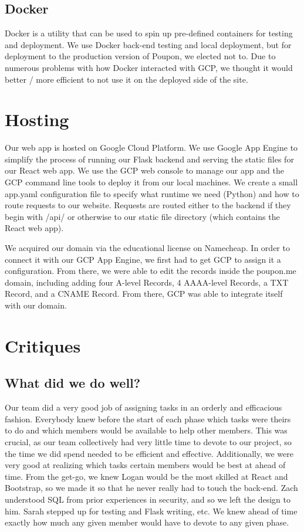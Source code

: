 \documentclass{scrartcl}
\begin{document}
    \subsection{Docker}\label{subsec:docker}
    Docker is a utility that can be used to spin up pre-defined containers for testing and deployment.
    We use Docker back-end testing and local deployment, but for deployment to the production version of Poupon, we elected not to.
    Due to numerous problems with how Docker interacted with GCP, we thought it would better / more efficient to not use it on the deployed side of the site.

    \newpage
    \section{Hosting}\label{sec:hosting}
    Our web app is hosted on Google Cloud Platform.
    We use Google App Engine to simplify the process of running our Flask backend and serving the static files for our React web app.
    We use the GCP web console to manage our app and the GCP command line tools to deploy it from our local machines.
    We create a small app.yaml configuration file to specify what runtime we need (Python) and how to route requests to our website.
    Requests are routed either to the backend if they begin with /api/ or otherwise to our static file directory (which contains the React web app).

    We acquired our domain via the educational license on Namecheap.
    In order to connect it with our GCP App Engine, we first had to get GCP to assign it a configuration.
    From there, we were able to edit the records inside the poupon.me domain, including adding four A-level Records, 4 AAAA-level Records, a TXT Record, and a CNAME Record.
    From there, GCP was able to integrate itself with our domain.


    \section{Critiques}\label{sec:critiques}
    \subsection*{What did we do well?}
    Our team did a very good job of assigning tasks in an orderly and efficacious fashion. Everybody knew before the start of each phase which tasks were theirs to do and which members would be available to help other members. This was crucial, as our team collectively had very little time to devote to our project, so the time we did spend needed to be efficient and effective. Additionally, we were very good at realizing which tasks certain members would be best at ahead of time. From the get-go, we knew Logan would be the most skilled at React and Bootstrap, so we made it so that he never really had to touch the back-end. Zach understood SQL from prior experiences in security, and so we left the design to him. Sarah stepped up for testing and Flask writing, etc. We knew ahead of time exactly how much any given member would have to devote to any given phase.
\end{document}
